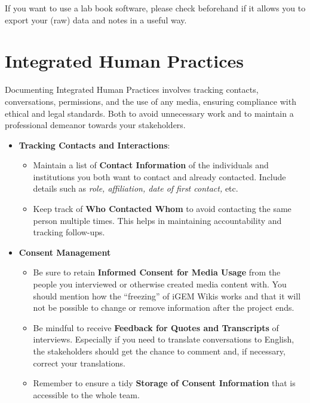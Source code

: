 \noindent If you want to use a lab book software, please check beforehand if it allows you to export your (raw) data and notes in a useful way. 

\section{Integrated Human Practices} \label{sec:ihp}  
Documenting Integrated Human Practices involves tracking contacts, conversations, permissions, and the use of any media, ensuring compliance with ethical and legal standards. \newline
Both to avoid unnecessary work and to maintain a professional demeanor towards your stakeholders.
\begin{itemize}
    \item \textbf{Tracking Contacts and Interactions}:
    \begin{itemize}
        \item Maintain a list of \textbf{Contact Information} of the individuals and institutions you both want to contact and already contacted.
        Include details such as \textit{role, affiliation, date of first contact,} etc.
        \item Keep track of \textbf{Who Contacted Whom} to avoid contacting the same person multiple times.
        This helps in maintaining accountability and tracking follow-ups.
    \end{itemize}
    \item \textbf{Consent Management} 
    \begin{itemize}
        \item Be sure to retain \textbf{Informed Consent for Media Usage} from the people you interviewed or otherwise created media content with.
        You should mention how the ``freezing'' of iGEM Wikis works and that it will not be possible to change or remove information after the project ends.
        \item Be mindful to receive \textbf{Feedback for Quotes and Transcripts} of interviews.  Especially if you need to translate conversations to English, the stakeholders should get the chance to comment and, if necessary, correct your translations.
        \item Remember to ensure a tidy \textbf{Storage of Consent Information} that is accessible to the whole team.
    \end{itemize}

\end{itemize}
